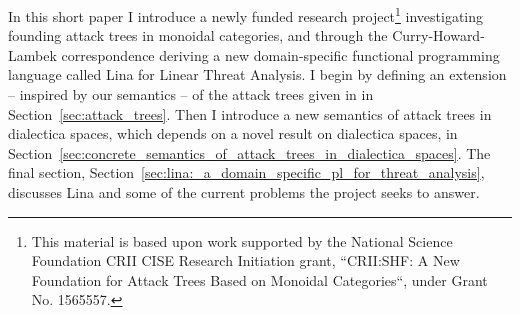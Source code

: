 \documentclass{llncs}
\begin{document}
In this short paper I introduce a newly funded research
project\footnote{This material is based upon work supported by the
  National Science Foundation CRII CISE Research Initiation grant,
  ``CRII:SHF: A New Foundation for Attack Trees Based on Monoidal
  Categories``, under Grant No. 1565557.}  investigating founding
attack trees in monoidal categories, and through the
Curry-Howard-Lambek correspondence deriving a new domain-specific
functional programming language called Lina for Linear Threat
Analysis.  I begin by defining an extension -- inspired by our
semantics -- of the attack trees given in \cite{Jhawar:2015} in
Section~\ref{sec:attack_trees}.  Then I introduce a new semantics of
attack trees in dialectica spaces, which depends on a novel result on
dialectica spaces, in
Section~\ref{sec:concrete_semantics_of_attack_trees_in_dialectica_spaces}.
The final section,
Section~\ref{sec:lina:_a_domain_specific_pl_for_threat_analysis},
discusses Lina and some of the current problems the project seeks to
answer.
\end{document}
